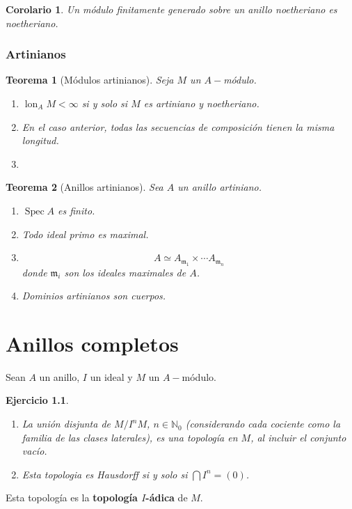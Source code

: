 \documentclass[12pt]{book}
\newtheorem{teo}{Teorema}
\newtheorem{ex}{Ejercicio}
\newtheorem{cor}{Corolario}
\begin{document}
\begin{cor}
	Un módulo finitamente generado sobre un anillo noetheriano es noetheriano.
\end{cor}


\subsection{Artinianos}
\begin{teo}[Módulos artinianos]
	
	Seja $M$ un $A-$módulo.
	
	\begin{enumerate}
		\item $\operatorname{lon} _A M < \infty $ si y solo si $M$ es artiniano y noetheriano.
		\item En el caso anterior, todas las secuencias de composición tienen la misma longitud.
		\item [aditividad]
	\end{enumerate}
	
\end{teo}


\begin{teo}[Anillos artinianos]
	Sea $A$ un anillo artiniano.
	\begin{enumerate}
		\item $\operatorname{Spec} A$ es finito.
		\item Todo ideal primo es maximal.
		\item $$A \simeq A_{\mathfrak{m}_1}  \times \cdots  A_{\mathfrak{m}_n}$$ donde $\mathfrak{m}_i$ son los ideales maximales de $A$.
		\item Dominios artinianos son cuerpos.
	\end{enumerate}
\end{teo}














\chapter{Anillos completos}


Sean $A$ un anillo, $I $ un ideal y $M$ un $A-$módulo.
\begin{ex}
\begin{enumerate}
\item La unión disjunta de $M/ I^n M$, $n\in \mathbb{N}_0$ (considerando cada cociente como la familia de las clases laterales), es una topología en $M$, al incluir el conjunto vacío.
\item Esta topologia es Hausdorff si y solo si $\bigcap I^n = (0)$.
\end{enumerate}
\end{ex}
Esta topología es la \textbf{topología $I$-ádica} de $M$.
\end{document}
